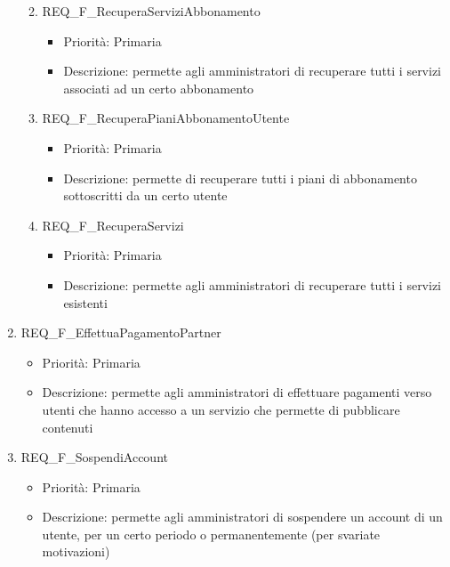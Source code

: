 \begin{enumerate}
\begin{enumerate}[label*=\arabic*.]
\begin{itemize}
			\end{itemize}
		\item REQ\_F\_RecuperaServiziAbbonamento
			\begin{itemize}	
			\item Priorità: Primaria
			\item Descrizione: permette agli amministratori di recuperare tutti i servizi associati ad un certo abbonamento
			\end{itemize}
		\item REQ\_F\_RecuperaPianiAbbonamentoUtente
			\begin{itemize}	
			\item Priorità: Primaria
			\item Descrizione: permette di recuperare tutti i piani di abbonamento sottoscritti da un certo utente
			\end{itemize}
		\item REQ\_F\_RecuperaServizi
			\begin{itemize}	
			\item Priorità: Primaria
			\item Descrizione: permette agli amministratori di recuperare tutti i servizi esistenti
			\end{itemize}
		\end{enumerate}

	\item REQ\_F\_EffettuaPagamentoPartner
		\begin{itemize}	
		\item Priorità: Primaria
		\item Descrizione: permette agli amministratori di effettuare pagamenti verso utenti che hanno accesso a un servizio che permette di pubblicare contenuti
		\end{itemize}

	\item REQ\_F\_SospendiAccount
		\begin{itemize}	
		\item Priorità: Primaria
		\item Descrizione: permette agli amministratori di sospendere un account di un utente, per un certo periodo o permanentemente  (per svariate motivazioni)	
		\end{itemize}

	

\end{enumerate}
